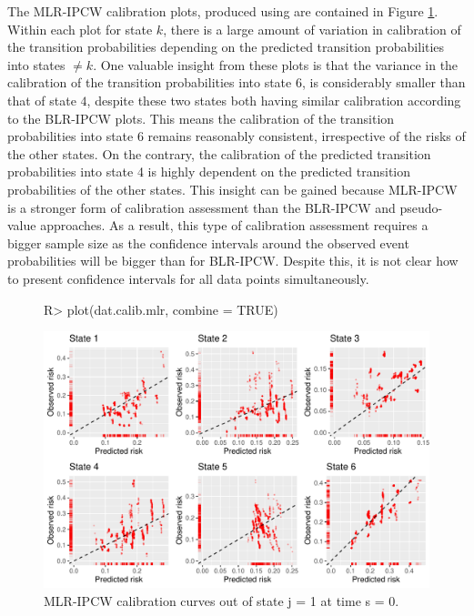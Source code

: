 \documentclass[article,shortnames]{jss}
\begin{document}
The MLR-IPCW calibration plots, produced using  are contained in Figure \ref{fig:mlrj1s0}. Within each plot for state $k$, there is a large amount of variation in calibration of the transition probabilities depending on the predicted transition probabilities into states $\neq k$. One valuable insight from these plots is that the variance in the calibration of the transition probabilities into state $6$, is considerably smaller than that of state $4$, despite these two states both having similar calibration according to the BLR-IPCW plots. This means the calibration of the transition probabilities into state 6 remains reasonably consistent, irrespective of the risks of the other states. On the contrary, the calibration of the predicted transition probabilities into state 4 is highly dependent on the predicted transition probabilities of the other states. This insight can be gained because MLR-IPCW is a stronger \citep{vanCalster2016} form of calibration assessment than the BLR-IPCW and pseudo-value approaches. As a result, this type of calibration assessment requires a bigger sample size as the confidence intervals around the observed event probabilities will be bigger than for BLR-IPCW. Despite this, it is not clear how to present confidence intervals for all data points simultaneously.

\begin{figure}
\centering
\begin{Schunk}
\begin{Sinput}
R> plot(dat.calib.mlr, combine = TRUE)
\end{Sinput}
\end{Schunk}
\includegraphics{calibmsm-jss-TEST-010}
\caption{\label{fig:mlrj1s0} MLR-IPCW calibration curves out of state j =  1 at time s = 0.}
\end{figure}
\end{document}
